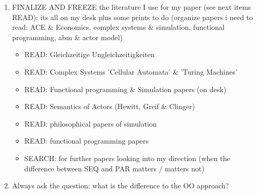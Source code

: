 \begin{enumerate}
\item FINALIZE AND FREEZE the literature I use for my paper (see next items READ): its all on my desk plus some prints to do (organize papers i need to read: ACE \& Economics, complex systems \& simulation, functional programming, abm \& actor model)
	\begin{itemize}
		\item READ: Gleichzeitige Ungleichzeitigkeiten
		\item READ: Complex Systems 'Cellular Automata' \& 'Turing Machines'
		\item READ: Functional programming \& Simulation papers (on desk)
		\item READ: Semantics of Actors (Hewitt, Greif \& Clinger)
		\item READ: philosophical papers of simulation
		\item READ: functional programming papers
		\item SEARCH: for further papers looking into my direction (when the difference between SEQ and PAR matters / matters not)
	\end{itemize}

\item Always ask the question: what is the difference to the OO approach? 
\end{enumerate} 

